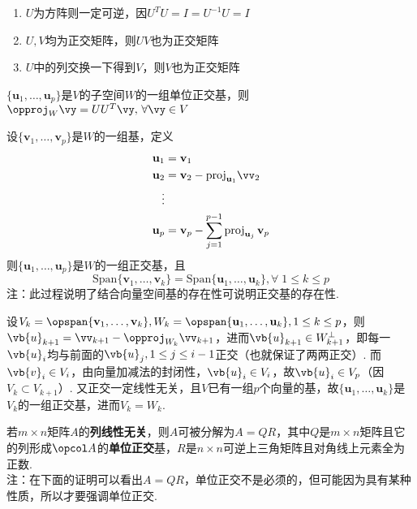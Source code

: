 \begin{proposition}
\begin{enumerate}
	\itemsep -3pt
	\item $U$为方阵则一定可逆，因$U^TU=I=U^{-1}U=I$
	\item $U,V$均为正交矩阵，则$UV$也为正交矩阵
	\item $U$中的列交换一下得到$V$，则$V$也为正交矩阵
\end{enumerate}
\end{proposition}
\begin{proposition}
$\{\mathbf{u}_1,\dots,\mathbf{u}_p\}$是$V$的子空间$W$的一组单位正交基，则$\opproj_{W}\vy=UU^T\vy,\,\forall\vy\in V$
\end{proposition}
\begin{myalgorithm}
\label{schmidt}
设$\{\mathbf{v}_1,\dots,\mathbf{v}_p\}$是$W$的一组基，定义
\[\begin{aligned}\mathbf {u} _{1}&=\mathbf {v} _{1}\\
\mathbf {u} _{2}&=\mathbf {v} _{2}-\mathrm {proj} _{\mathbf {u} _{1}}\vv_2\\
\vdots\\
\mathbf {u} _{p}&=\mathbf {v} _{p}-\sum _{j=1}^{p-1}\mathrm {proj} _{\mathbf {u} _{j}}\,\mathbf {v} _{p}\end{aligned}\]
则$\{\mathbf{u}_1,\dots,\mathbf{u}_p\}$是$W$的一组正交基，且
\[\mathrm{Span}\{\mathbf{v}_1,\dots,\mathbf{v}_k\}=\mathrm{Span}\{\mathbf{u}_1,\dots,\mathbf{u}_k\},\forall\;1\leq k\leq p\]
注：此过程说明了结合向量空间基的存在性可说明正交基的存在性.
\end{myalgorithm}
\begin{analysis}
设$V_k=\opspan\{\mathbf{v}_1,\dots,\mathbf{v}_k\},W_k=\opspan\{\mathbf{u}_1,\dots,\mathbf{u}_k\},1\leq k\leq p$，则$\vb{u}_{k+1}=\vv_{k+1}-\opproj_{W_k}\vv_{k+1}$，进而$\vb{u}_{k+1}\in W_{k+1}^\perp$，即每一$\vb{u}_i$均与前面的$\vb{u}_j,1\leq j\leq i-1$正交（也就保证了两两正交）. 而$\vb{v}_i\in V_i$，由向量加减法的封闭性，$\vb{u}_i\in V_i$，故$\vb{u}_i\in V_p$（因$V_k\subset V_{k+1}$）. 又正交一定线性无关，且$V$已有一组$p$个向量的基，故$\{\mathbf{u}_1,\dots,\mathbf{u}_k\}$是$V_k$的一组正交基，进而$V_k=W_k$.\\
\end{analysis}
\begin{theorem}[QR分解]
\label{qr_fact}
若$m\times n$矩阵$A$的\textbf{列线性无关}，则$A$可被分解为$A=QR$，其中$Q$是$m\times n$矩阵且它的列形成$\opcol A$的\textbf{单位正交}基，$R$是$n\times n$可逆上三角矩阵且对角线上元素全为正数.\\
注：在下面的证明可以看出$A=QR$，单位正交不是必须的，但可能因为具有某种性质，所以才要强调单位正交.
\end{theorem}

